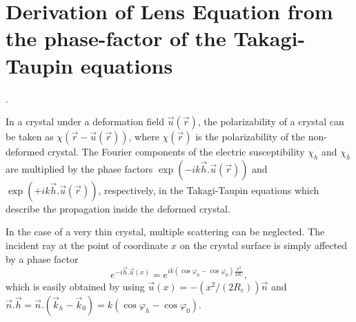 \documentclass[preprint]{iucr}              %
\newcommand{\inred}[1]{{\color{red}#1}}
\begin{document}


\appendix
\section{\inred{Derivation of} Lens Equation from the phase-factor of the Takagi-Taupin equations}
\label{appendix:CLE}.

In a crystal under a deformation field $\vec u(\vec r)$, the polarizability of a crystal can be taken as $\chi(\vec r-\vec u(\vec r))$, where $\chi(\vec r)$ is the polarizability of the non-deformed crystal. The Fourier components of the electric susceptibility $\chi_h$ and $\chi_{\bar h}$ are multiplied by the phase factors $\exp(-i k \vec h . \vec u (\vec r))$ and $\exp(+i k \vec h . \vec u (\vec r))$, respectively, in the Takagi-Taupin equations which describe  the propagation inside the deformed crystal.

In the case of a very thin crystal, multiple scattering can be neglected. The incident ray at the point of coordinate $x$ on the crystal surface is simply affected by a phase factor 
\begin{equation}
    e^{-i \vec h . \vec u(x)} = e^{i k (\cos\varphi_h-\cos\varphi_0) \frac{x^2}{2 R_c} },
\end{equation}
which is easily obtained by using $\vec u(x) = -(x^2/(2R_c))\vec n$ and $\vec n . \vec h = \vec n.(\vec k_h - \vec k_0) = k(\cos\varphi_h-\cos\varphi_0)$. 
\end{document}
